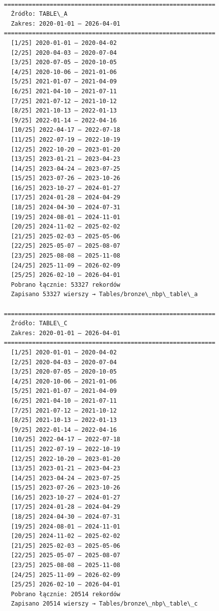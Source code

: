 \documentclass[11pt]{article}
\begin{document}
    
    \begin{Verbatim}[commandchars=\\\{\}]

============================================================
  Źródło: TABLE\_A
  Zakres: 2020-01-01 — 2026-04-01
============================================================
  [1/25] 2020-01-01 — 2020-04-02
  [2/25] 2020-04-03 — 2020-07-04
  [3/25] 2020-07-05 — 2020-10-05
  [4/25] 2020-10-06 — 2021-01-06
  [5/25] 2021-01-07 — 2021-04-09
  [6/25] 2021-04-10 — 2021-07-11
  [7/25] 2021-07-12 — 2021-10-12
  [8/25] 2021-10-13 — 2022-01-13
  [9/25] 2022-01-14 — 2022-04-16
  [10/25] 2022-04-17 — 2022-07-18
  [11/25] 2022-07-19 — 2022-10-19
  [12/25] 2022-10-20 — 2023-01-20
  [13/25] 2023-01-21 — 2023-04-23
  [14/25] 2023-04-24 — 2023-07-25
  [15/25] 2023-07-26 — 2023-10-26
  [16/25] 2023-10-27 — 2024-01-27
  [17/25] 2024-01-28 — 2024-04-29
  [18/25] 2024-04-30 — 2024-07-31
  [19/25] 2024-08-01 — 2024-11-01
  [20/25] 2024-11-02 — 2025-02-02
  [21/25] 2025-02-03 — 2025-05-06
  [22/25] 2025-05-07 — 2025-08-07
  [23/25] 2025-08-08 — 2025-11-08
  [24/25] 2025-11-09 — 2026-02-09
  [25/25] 2026-02-10 — 2026-04-01
  Pobrano łącznie: 53327 rekordów
  Zapisano 53327 wierszy → Tables/bronze\_nbp\_table\_a

============================================================
  Źródło: TABLE\_C
  Zakres: 2020-01-01 — 2026-04-01
============================================================
  [1/25] 2020-01-01 — 2020-04-02
  [2/25] 2020-04-03 — 2020-07-04
  [3/25] 2020-07-05 — 2020-10-05
  [4/25] 2020-10-06 — 2021-01-06
  [5/25] 2021-01-07 — 2021-04-09
  [6/25] 2021-04-10 — 2021-07-11
  [7/25] 2021-07-12 — 2021-10-12
  [8/25] 2021-10-13 — 2022-01-13
  [9/25] 2022-01-14 — 2022-04-16
  [10/25] 2022-04-17 — 2022-07-18
  [11/25] 2022-07-19 — 2022-10-19
  [12/25] 2022-10-20 — 2023-01-20
  [13/25] 2023-01-21 — 2023-04-23
  [14/25] 2023-04-24 — 2023-07-25
  [15/25] 2023-07-26 — 2023-10-26
  [16/25] 2023-10-27 — 2024-01-27
  [17/25] 2024-01-28 — 2024-04-29
  [18/25] 2024-04-30 — 2024-07-31
  [19/25] 2024-08-01 — 2024-11-01
  [20/25] 2024-11-02 — 2025-02-02
  [21/25] 2025-02-03 — 2025-05-06
  [22/25] 2025-05-07 — 2025-08-07
  [23/25] 2025-08-08 — 2025-11-08
  [24/25] 2025-11-09 — 2026-02-09
  [25/25] 2026-02-10 — 2026-04-01
  Pobrano łącznie: 20514 rekordów
  Zapisano 20514 wierszy → Tables/bronze\_nbp\_table\_c


\end{Verbatim}
\end{document}
